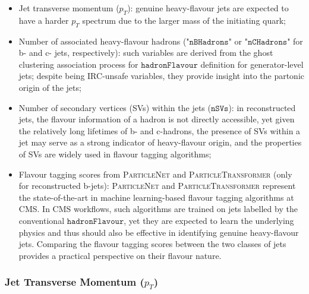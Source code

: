 \documentclass[10pt,twocolumn]{article}
\newcommand*{\hadFlav}{\texttt{hadronFlavour}}
\begin{document}
\begin{itemize}
    \item Jet transverse momentum ($p_T$): genuine heavy-flavour jets are expected to have a harder $p_T$ spectrum due to the larger mass of the initiating quark;
    \item Number of associated heavy-flavour hadrons ("$\texttt{nBHadrons}$" or "$\texttt{nCHadrons}$" for b- and c- jets, respectively): such variables are derived from the ghost clustering association process for $\hadFlav$ definition for generator-level jets; despite being IRC-unsafe variables, they provide insight into the partonic origin of the jets;
    \item Number of secondary vertices (SVs) within the jets ($\texttt{nSVs}$): in reconstructed jets, the flavour information of a hadron is not directly accessible, yet given the relatively long lifetimes of b- and c-hadrons, the presence of SVs within a jet may serve as a strong indicator of heavy-flavour origin, and the properties of SVs are widely used in flavour tagging algorithms;
    \item Flavour tagging scores from \textsc{ParticleNet} \cite{quParticleNetJetTagging2020} and \textsc{ParticleTransformer} \cite{quParticleTransformerJet2024} (only for reconstructed b-jets): \textsc{ParticleNet} and \textsc{ParticleTransformer} represent the state-of-the-art in machine learning-based flavour tagging algorithms at CMS. In CMS workflows, such algorithms are trained on jets labelled by the conventional $\hadFlav$, yet they are expected to learn the underlying physics and thus should also be effective in identifying genuine heavy-flavour jets. Comparing the flavour tagging scores between the two classes of jets provides a practical perspective on their flavour nature.
\end{itemize}

\subsubsection{Jet Transverse Momentum (\texorpdfstring{$p_T$}{pT})}
\label{sec:vali-vars-pt}
\end{document}
